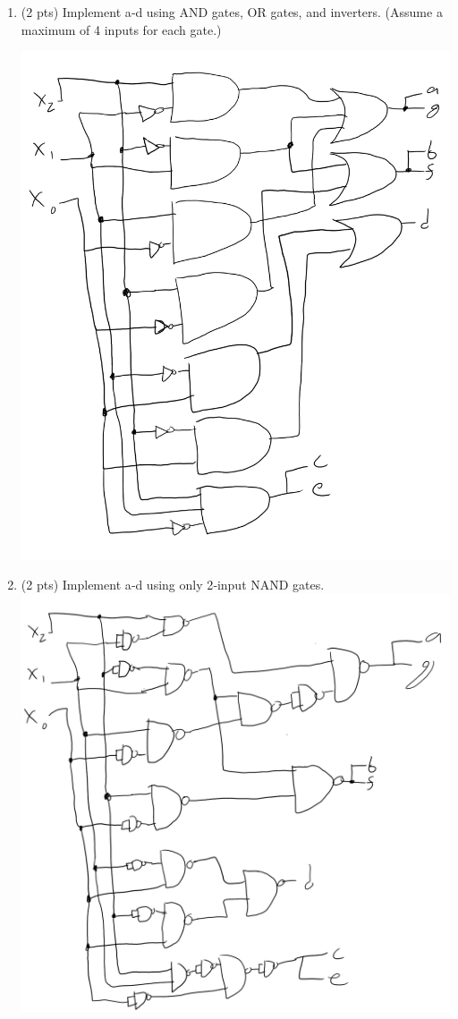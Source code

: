 \documentclass[12pt,letterpaper,titlepage]{report}
\begin{document}
\begin{raggedright}
\begin{enumerate} [label=\alph*)]
\begin{paracol}{2}
\end{paracol}
\item (2 pts) Implement a‐d using AND gates, OR gates, and inverters. (Assume a maximum of 4 inputs for each gate.)

\includegraphics[scale=0.45]{hw5p3c}

\item (2 pts) Implement a‐d using only 2‐input NAND gates. 
\includegraphics[scale=0.6]{hw5p3d}


\end{enumerate}
\end{raggedright}
\end{document}
